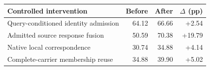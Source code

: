 \begin{tabular}{lrrr}
\toprule
Controlled intervention & Before & After & $\Delta$ (pp) \\
\midrule
Query-conditioned identity admission & 64.12 & 66.66 & +2.54 \\
Admitted source response fusion & 50.59 & 70.38 & +19.79 \\
Native local correspondence & 30.74 & 34.88 & +4.14 \\
Complete-carrier membership reuse & 34.88 & 39.90 & +5.02 \\
\bottomrule
\end{tabular}
